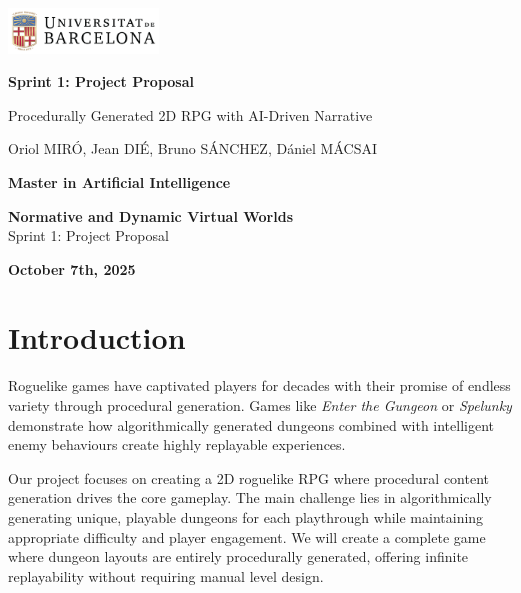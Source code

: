 \documentclass[11pt]{article}
\begin{document}
\begin{titlepage}
    \centering
    \vspace*{1cm}

    \includegraphics[width=0.3\textwidth]{figures/ub_logo.png}

    \vspace{1.5cm}
    {\Huge\bfseries Sprint 1: Project Proposal\par}
    \vspace{1cm}
    {\large Procedurally Generated 2D RPG with AI-Driven Narrative\par}
    \vspace{2cm}
    {\large Oriol MIR\'O, Jean DI\'E, Bruno S\'ANCHEZ, D\'aniel M\'ACSAI\par}
    \vspace{3cm}
    {\large \textbf{Master in Artificial Intelligence}\par}
    \vspace{0.5cm}
    {\large \textbf{Normative and Dynamic Virtual Worlds}\\ Sprint 1: Project Proposal\par}
    \vspace{1cm}
    {\large\bfseries October 7th, 2025\par}
\end{titlepage}

\pagestyle{empty}

\newpage
\tableofcontents
\newpage

\setcounter{page}{1}
\pagestyle{plain}

\section{Introduction}
\label{sec:introduction}

Roguelike games have captivated players for decades with their promise of endless variety through procedural generation. Games like \emph{Enter the Gungeon} or \emph{Spelunky} demonstrate how algorithmically generated dungeons combined with intelligent enemy behaviours create highly replayable experiences.

Our project focuses on creating a 2D roguelike RPG where procedural content generation drives the core gameplay. 
The main challenge lies in algorithmically generating unique, playable dungeons for each playthrough while maintaining appropriate difficulty and player engagement. 
We will create a complete game where dungeon layouts are entirely procedurally generated, offering infinite replayability without requiring manual level design.
\end{document}
